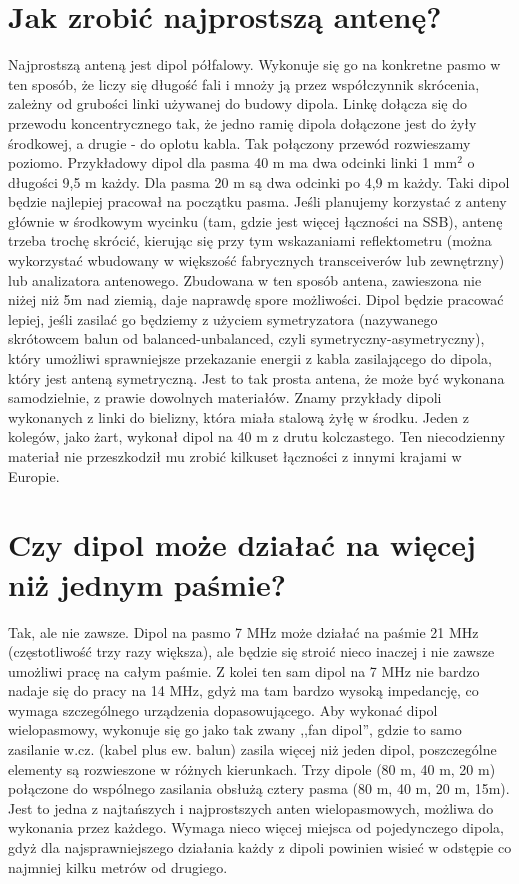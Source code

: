 \documentclass[a4paper,12pt]{article}
\begin{document}
\section{Jak zrobić najprostszą antenę?}
Najprostszą anteną jest dipol półfalowy. Wykonuje się go na konkretne pasmo w ten sposób, że liczy się długość fali i mnoży ją przez współczynnik skrócenia, zależny od grubości linki używanej do budowy dipola. Linkę dołącza się do przewodu koncentrycznego tak, że jedno ramię dipola dołączone jest do żyły środkowej, a drugie - do oplotu kabla. Tak połączony przewód rozwieszamy poziomo. Przykładowy dipol dla pasma 40 m ma dwa odcinki linki 1 mm\(^2\) o długości 9,5 m każdy. Dla pasma 20 m są dwa odcinki po 4,9 m każdy. Taki dipol będzie najlepiej pracował na początku pasma. Jeśli planujemy korzystać z anteny głównie w środkowym wycinku (tam, gdzie jest więcej łączności na SSB), antenę trzeba trochę skrócić, kierując się przy tym wskazaniami reflektometru (można wykorzystać wbudowany w większość fabrycznych transceiverów lub zewnętrzny) lub analizatora antenowego. Zbudowana w ten sposób antena, zawieszona nie niżej niż 5m nad ziemią, daje naprawdę spore możliwości. Dipol będzie pracować lepiej, jeśli zasilać go będziemy z użyciem symetryzatora (nazywanego skrótowcem balun od balanced-unbalanced, czyli symetryczny-asymetryczny), który umożliwi sprawniejsze przekazanie energii z kabla zasilającego do dipola, który jest anteną symetryczną.
Jest to tak prosta antena, że może być wykonana samodzielnie, z prawie dowolnych materiałów. Znamy przykłady dipoli wykonanych z linki do bielizny, która miała stalową żyłę w środku. Jeden z kolegów, jako żart, wykonał dipol na 40 m z drutu kolczastego. Ten niecodzienny materiał nie przeszkodził mu zrobić kilkuset łączności z innymi krajami w Europie.

\section{Czy dipol może działać na więcej niż jednym paśmie?}
Tak, ale nie zawsze. Dipol na pasmo 7 MHz może działać na paśmie 21 MHz (częstotliwość trzy razy większa), ale będzie się stroić nieco inaczej i nie zawsze umożliwi pracę na całym paśmie. Z kolei ten sam dipol na 7 MHz nie bardzo nadaje się do pracy na 14 MHz, gdyż ma tam bardzo wysoką impedancję, co wymaga szczególnego urządzenia dopasowującego. Aby wykonać dipol wielopasmowy, wykonuje się go jako tak zwany ,,fan dipol'', gdzie to samo zasilanie w.cz. (kabel plus ew. balun) zasila więcej niż jeden dipol, poszczególne elementy są rozwieszone w różnych kierunkach. Trzy dipole (80 m, 40 m, 20 m) połączone do wspólnego zasilania obsłużą cztery pasma (80 m, 40 m, 20 m, 15m). Jest to jedna z najtańszych i najprostszych anten wielopasmowych, możliwa do wykonania przez każdego. Wymaga nieco więcej miejsca od pojedynczego dipola, gdyż dla najsprawniejszego działania każdy z dipoli powinien wisieć w odstępie co najmniej kilku metrów od drugiego.
\end{document}
